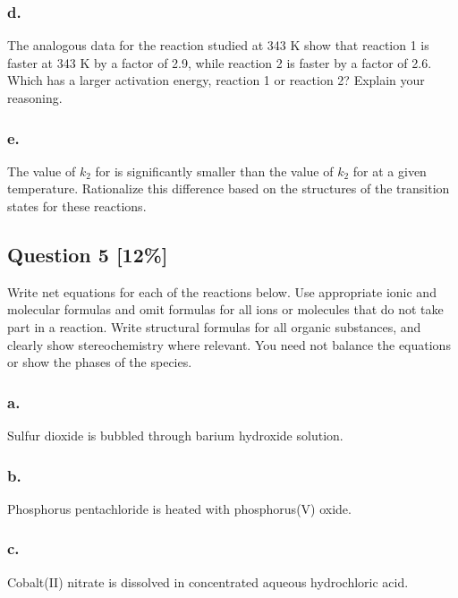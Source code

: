 \documentclass[11pt,letterpaper]{article}
\begin{document}
\subsubsection*{d.}
The analogous data for the reaction studied at 343 K show that reaction 1 is faster at 343 K by a factor of 2.9, while reaction 2 is faster by a factor of 2.6. Which has a larger activation energy, reaction 1 or reaction 2? Explain your reasoning.
\vspace{4cm}

\subsubsection*{e.}
The value of $k_2$ for  is significantly smaller than the value of $k_2$ for  at a given temperature. Rationalize this difference based on the structures of the transition states for these reactions.
\vspace{4cm}

\newpage
\subsection*{Question 5 [12\%]}
Write net equations for each of the reactions below. Use appropriate ionic and molecular formulas and omit formulas for all ions or molecules that do not take part in a reaction. Write structural formulas for all organic substances, and clearly show stereochemistry where relevant. You need not balance the equations or show the phases of the species.

\subsubsection*{a.} Sulfur dioxide is bubbled through barium hydroxide solution.
\vspace{2cm}

\subsubsection*{b.} Phosphorus pentachloride is heated with phosphorus(V) oxide.
\vspace{2cm}

\subsubsection*{c.} Cobalt(II) nitrate is dissolved in concentrated aqueous hydrochloric acid.
\vspace{2cm}
\end{document}

